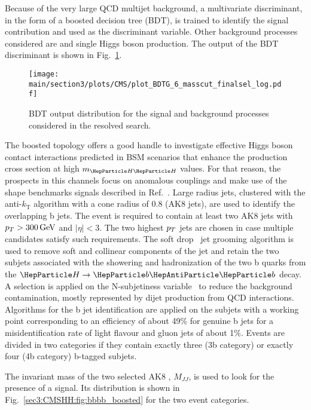 Because of the very large QCD multijet background, a multivariate discriminant, in the form of a boosted decision tree (BDT), is trained to identify the \HH signal contribution and used as the discriminant variable.
Other background processes considered are \ttbar and single Higgs boson production.
The output of the BDT discriminant is shown in Fig.~\ref{sec3:CMSHH:fig:bbbb_BDT}.

\begin{figure}[!htb]
\centering 
\texttt{[image: \\main/section3/plots/CMS/plot\_BDTG\_6\_masscut\_finalsel\_log.pdf]}
\caption{BDT output distribution for the signal and background processes considered in the \bbbb resolved search.} 
\label{sec3:CMSHH:fig:bbbb_BDT} 
\end{figure}

The boosted topology offers a good handle to investigate effective Higgs boson contact interactions predicted in BSM scenarios that enhance the \HH production cross section at high $m_{\HH}$ values.
For that reason, the prospects in this channels focus on anomalous couplings and make use of the shape benchmarks signals described in Ref.~\cite{Carvalho2016}.
Large radius jets, clustered with the anti-$k_\text{T}$ algorithm with a cone radius of 0.8 (AK8 jets), are used to identify the  overlapping b jets.
The event is required to contain at least two AK8 jets with $p_{T} > 300\,\text{Ge\hspace{-.08em}V}$ and $|\eta| < 3$.
The two highest $p_{T}$ jets are chosen in case multiple candidates satisfy such requirements.
The soft drop~\cite{Dasgupta:2013ihk,Larkoski:2014wba} jet grooming algorithm is used to remove soft and collinear components of the jet and retain the two subjets associated with the showering and hadronization of the two b quarks from the $\PH\to\PQb\PAQb$ decay.
A selection is applied on the N-subjetiness variable~\cite{Thaler:2011gf} to reduce the background contamination, mostly represented by dijet production from QCD interactions.
Algorithms for the b jet identification are applied on the subjets with a working point corresponding to an efficiency of about 49\% for genuine b jets for a misidentification rate of light flavour and gluon jets of about 1\%.
Events are divided in two categories if they contain exactly three (3b category) or exactly four (4b category) b-tagged subjets.

The invariant mass of the two selected AK8 , $M_{JJ}$, is used to look for the presence of a signal. Its distribution is shown in Fig.~\ref{sec3:CMSHH:fig:bbbb_boosted} for the two event categories.

